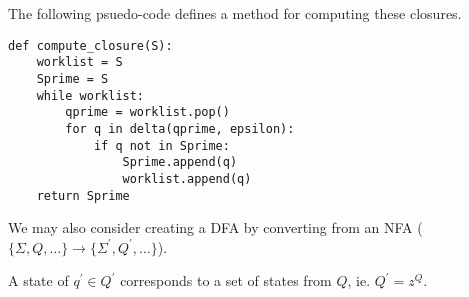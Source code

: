 \documentclass[12pt]{article}
\begin{document}
The following psuedo-code defines a method for computing these closures.

\begin{verbatim}
def compute_closure(S):
    worklist = S
    Sprime = S
    while worklist:
        qprime = worklist.pop()
        for q in delta(qprime, epsilon):
            if q not in Sprime:
                Sprime.append(q)
                worklist.append(q)
    return Sprime
\end{verbatim}

We may also consider creating a DFA by converting from an NFA ($\{\Sigma, Q, \dots\} \to \{\Sigma^\prime, Q^\prime, \dots\}$).

A state of $q^\prime \in Q^\prime$ corresponds to a set of states from $Q$, ie. $Q^\prime = z^Q$.
\end{document}

